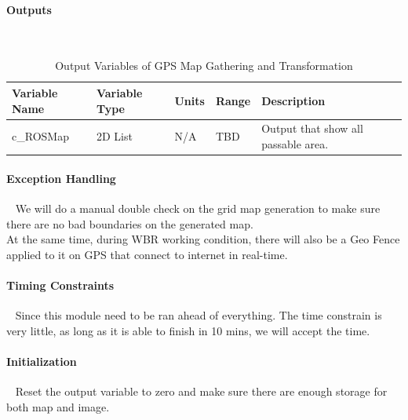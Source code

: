 \documentclass[12pt]{article}
\begin{document}
            \paragraph{Outputs}
                ~\newline
                \begin{table}[H]
                  \centering
                    \caption{Output Variables of GPS Map Gathering and Transformation} 
                    \label{tbl:Output Variables of GPS Map Gathering and Transformation}
                  \begin{tabularx}{\textwidth}{|p{5cm}|p{2cm}|p{1.2cm}|p{1cm}|X|}
                    \hline Variable Name & Variable Type & Units & Range & Description \\
                    \hline c\_ROSMap & 2D List & N/A & TBD & Output that show all passable area.\\
                    \hline
                  \end{tabularx}
                \end{table} 
                
            \paragraph{Exception Handling}
                ~\newline
                We will do a manual double check on the grid map generation to make sure there are no bad boundaries on the generated map. \\
                At the same time, during WBR working condition, there will also be a Geo Fence applied to it on GPS that connect to internet in real-time. 
                
            \paragraph{Timing Constraints}
                ~\newline
                Since this module need to be ran ahead of everything. The time constrain is very little, as long as it is able to finish in 10 mins, we will accept the time.
                
            \paragraph{Initialization}
                ~\newline
                Reset the output variable to zero and make sure there are enough storage for both map and image.
                
\end{document}
